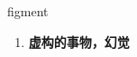 
\begin{frame}
{\huge figment}
\begin{center}
\begin{enumerate}\Large
  \item \textbf{虚构的事物，幻觉}
\end{enumerate}
\end{center}
\end{frame}
